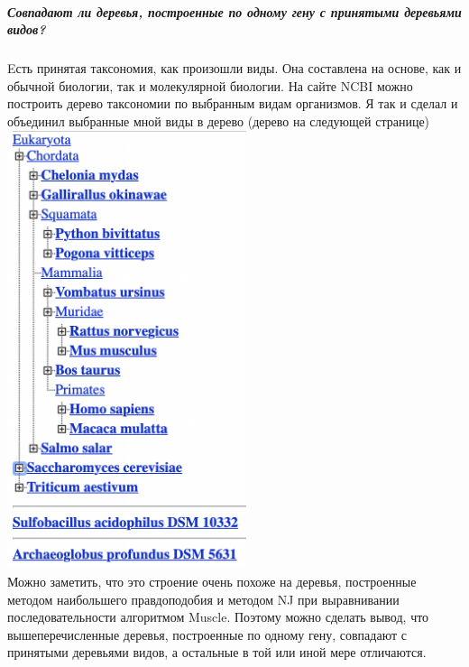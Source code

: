 \documentclass[12pt]{article}
\begin{document}
\subparagraph{Совпадают ли деревья, построенные по одному гену с принятыми деревьями видов?\\}
Eсть принятая таксономия, как произошли виды. Она составлена на основе, как и обычной биологии, так и молекулярной биологии. На сайте NCBI можно построить дерево таксономии по выбранным видам организмов. Я так и сделал и объединил выбранные мной виды в дерево (дерево на следующей странице)
\newpage
\includegraphics[width=7cm]{images/image9.png}\\
Можно заметить, что это строение очень похоже на деревья, построенные методом наибольшего правдоподобия и методом NJ при выравнивании последовательности алгоритмом Muscle. Поэтому можно сделать вывод, что вышеперечисленные деревья, построенные по одному гену, совпадают с принятыми деревьями видов, а остальные в той или иной мере отличаются.
\end{document}
